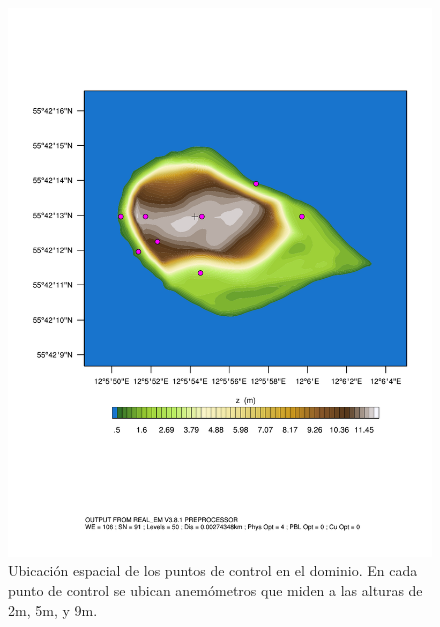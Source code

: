 \begin{figure}[H]
	\centering
	\includegraphics[width=0.9\linewidth,page=1,trim={0cm 6cm -1cm 4cm},clip]{Imagenes/05/bol_control_point.pdf}%
	\caption{Ubicación espacial de los puntos de control en el dominio. En cada punto de control se ubican anemómetros que miden a las alturas de 2m, 5m, y 9m.}
	\label{fig:c3control_points}
\end{figure}

